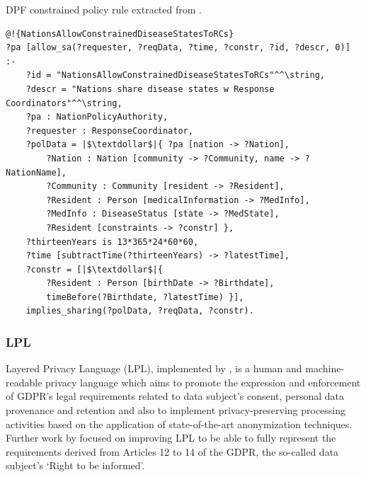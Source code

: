 \begin{listing}
\caption{DPF constrained policy rule extracted from \cite{martiny_protecting_2018}.}
\label{list:dpf_example}
\begin{verbatim}
@!{NationsAllowConstrainedDiseaseStatesToRCs}
?pa [allow_sa(?requester, ?reqData, ?time, ?constr, ?id, ?descr, 0)] :-
    ?id = "NationsAllowConstrainedDiseaseStatesToRCs"^^\string,
    ?descr = "Nations share disease states w Response Coordinators"^^\string,
    ?pa : NationPolicyAuthority,
    ?requester : ResponseCoordinator,
    ?polData = |$\textdollar$|{ ?pa [nation -> ?Nation],
        ?Nation : Nation [community -> ?Community, name -> ?NationName],
        ?Community : Community [resident -> ?Resident],
        ?Resident : Person [medicalInformation -> ?MedInfo],
        ?MedInfo : DiseaseStatus [state -> ?MedState],
        ?Resident [constraints -> ?constr] },
    ?thirteenYears is 13*365*24*60*60, 
    ?time [subtractTime(?thirteenYears) -> ?latestTime],
    ?constr = [|$\textdollar$|{ 
        ?Resident : Person [birthDate -> ?Birthdate],
        timeBefore(?Birthdate, ?latestTime) }],
    implies_sharing(?polData, ?reqData, ?constr).
\end{verbatim}
\end{listing}

\subsubsection{LPL}
\label{sec:lpl}

Layered Privacy Language (LPL), implemented by \cite{gerl_lpl_2018}, is a human and machine-readable privacy language which aims to promote the expression and enforcement of GDPR's legal requirements related to data subject's consent, personal data provenance and retention and also to implement privacy-preserving processing activities based on the application of state-of-the-art anonymization techniques. 
Further work by \cite{gerl_critical_2018} focused on improving LPL to be able to fully represent the requirements derived from Articles 12 to 14 of the GDPR, the so-called data subject's `Right to be informed'.

